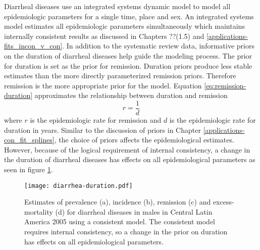 Diarrheal diseases use an integrated systems dynamic model to model all epidemiologic parameters for a single time, place and sex.  An integrated systems model estimates all epidemiologic parameters simultaneously which maintains internally consistent results as discussed in Chapters ??(1.5) and \ref{applications-fits_incon_v_con}.  In addition to the systematic review data, informative priors on the duration of diarrheal diseases help guide the modeling process.  The prior for duration is set as the prior for remission.  Duration priors produce less stable estimates than the more directly parameterized remission priors.  Therefore remission is the more appropriate prior for the model.  Equation \ref{eq:remission-duration} approximates the relationship between duration and remission
    \begin{equation} \label{eq:remission-duration}
    	r = \frac{1}{d}
    \end{equation}
where $r$ is the epidemiologic rate for remission and $d$ is the epidemiologic rate for duration in years.  Similar to the discussion of priors in Chapter \ref{applications-con_fit_splines}, the choice of priors affects the epidemiological estimates.  However, because of the logical requirement of internal consistency, a change in the duration of diarrheal diseases has effects on all epidemiological parameters as seen in figure \ref{fig:app-diarrhea duration}.

    \begin{figure}[h]
        \begin{center}
            \texttt{[image: diarrhea-duration.pdf]}
            \caption{Estimates of prevalence (a), incidence (b), remission (c) and excess-mortality (d) for diarrheal diseases in males in Central Latin America 2005 using a consistent model.  The consistent model requires internal consistency, so a change in the prior on duration has effects on all epidemiological parameters.}
            \label{fig:app-diarrhea duration}
        \end{center}
    \end{figure}
